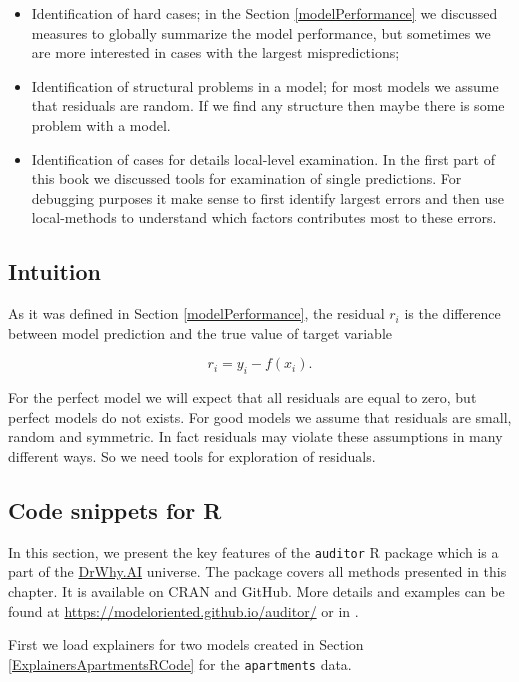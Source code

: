 \documentclass[12pt,]{krantz}
\providecommand{\tightlist}{%
  \setlength{\itemsep}{0pt}\setlength{\parskip}{0pt}}
\begin{document}
\begin{itemize}
\tightlist
\item
  Identification of hard cases; in the Section \ref{modelPerformance} we discussed measures to globally summarize the model performance, but sometimes we are more interested in cases with the largest mispredictions;
\item
  Identification of structural problems in a model; for most models we assume that residuals are random. If we find any structure then maybe there is some problem with a model.
\item
  Identification of cases for details local-level examination. In the first part of this book we discussed tools for examination of single predictions. For debugging purposes it make sense to first identify largest errors and then use local-methods to understand which factors contributes most to these errors.
\end{itemize}

\hypertarget{intuition}{%
\subsection{Intuition}\label{intuition}}

As it was defined in Section \ref{modelPerformance}, the residual \(r_i\) is the difference between model prediction and the true value of target variable

\[
r_i = y_i - f(x_i).
\]

For the perfect model we will expect that all residuals are equal to zero, but perfect models do not exists.
For good models we assume that residuals are small, random and symmetric. In fact residuals may violate these assumptions in many different ways. So we need tools for exploration of residuals.

\hypertarget{code-snippets-for-r}{%
\subsection{Code snippets for R}\label{code-snippets-for-r}}

In this section, we present the key features of the \texttt{auditor} R package \citep{auditor} which is a part of the \href{http://DrWhy.AI}{DrWhy.AI} universe. The package covers all methods presented in this chapter. It is available on CRAN and GitHub. More details and examples can be found at \url{https://modeloriented.github.io/auditor/} or in \citep{auditorarxiv}.

First we load explainers for two models created in Section \ref{ExplainersApartmentsRCode} for the \texttt{apartments} data.
\end{document}
